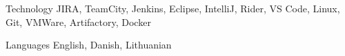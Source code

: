 

\begin{cvskills}

  \cvskill
    {Technology} %
    {JIRA, TeamCity, Jenkins, Eclipse, IntelliJ, Rider, VS Code, Linux, Git, VMWare, Artifactory, Docker} %


  \cvskill
    {Languages} %
    {English, Danish, Lithuanian} %

\end{cvskills}
